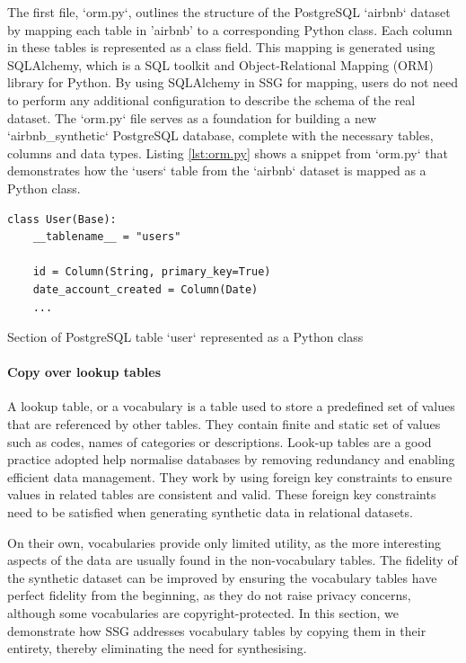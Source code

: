 \documentclass[11pt]{article}
\begin{document}
The first file, `orm.py`, outlines the structure of the PostgreSQL `airbnb` dataset by mapping each table in 'airbnb' to a corresponding Python class. Each column in these tables is represented as a class field. This mapping is generated using SQLAlchemy\cite{sqlalchemy}, which is a SQL toolkit and Object-Relational Mapping (ORM) library for Python. By using SQLAlchemy in SSG for mapping, users do not need to perform any additional configuration to describe the schema of the real dataset. The `orm.py` file serves as a foundation for building a new `airbnb\_synthetic` PostgreSQL database, complete with the necessary tables, columns and data types. Listing \ref{lst:orm.py} shows a snippet from `orm.py` that demonstrates how the  `users` table from the `airbnb`  dataset is mapped as a Python class.

\begin{listing}[H]
\begin{verbatim}
class User(Base):
    __tablename__ = "users"

    id = Column(String, primary_key=True)
    date_account_created = Column(Date)
    ...
\end{verbatim}
\caption{Section of PostgreSQL table `user` represented as a Python class}
\label{lst:orm.py}
\end{listing}

\paragraph{Copy over lookup tables}

A lookup table, or a vocabulary is a table used to store a predefined set of values that are referenced by other tables. They contain finite and static set of values such as codes, names of categories or descriptions. Look-up tables are a good practice adopted help normalise databases by removing redundancy and enabling efficient data management. They work by using foreign key constraints to ensure values in related tables are consistent and valid. These foreign key constraints need to be satisfied when generating synthetic data in relational datasets.  

On their own, vocabularies provide only limited utility, as the more interesting aspects of the data are usually found in the non-vocabulary tables. The fidelity of the synthetic dataset can be improved by ensuring the vocabulary tables have perfect fidelity from the beginning, as they do not raise privacy concerns, although some vocabularies are copyright-protected. In this section, we demonstrate how SSG addresses vocabulary tables by copying them in their entirety, thereby eliminating the need for synthesising.
\end{document}
